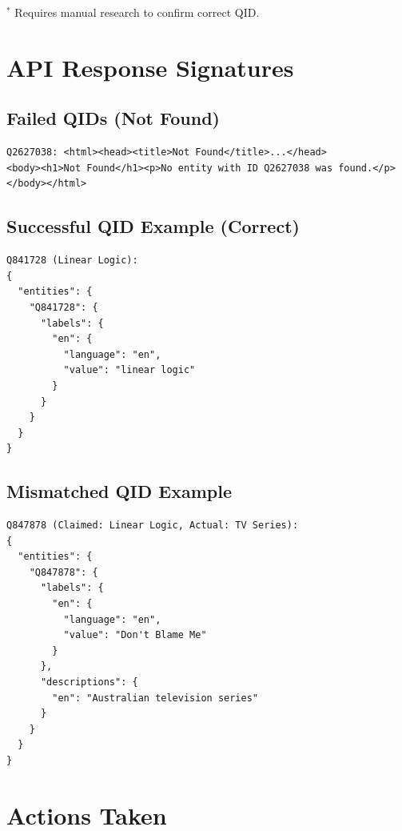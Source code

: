 $^*$ Requires manual research to confirm correct QID.

\section*{API Response Signatures}

\subsection*{Failed QIDs (Not Found)}

\begin{verbatim}
Q2627038: <html><head><title>Not Found</title>...</head>
<body><h1>Not Found</h1><p>No entity with ID Q2627038 was found.</p></body></html>
\end{verbatim}

\subsection*{Successful QID Example (Correct)}

\begin{verbatim}
Q841728 (Linear Logic):
{
  "entities": {
    "Q841728": {
      "labels": {
        "en": {
          "language": "en",
          "value": "linear logic"
        }
      }
    }
  }
}
\end{verbatim}

\subsection*{Mismatched QID Example}

\begin{verbatim}
Q847878 (Claimed: Linear Logic, Actual: TV Series):
{
  "entities": {
    "Q847878": {
      "labels": {
        "en": {
          "language": "en",
          "value": "Don't Blame Me"
        }
      },
      "descriptions": {
        "en": "Australian television series"
      }
    }
  }
}
\end{verbatim}

\section*{Actions Taken}

